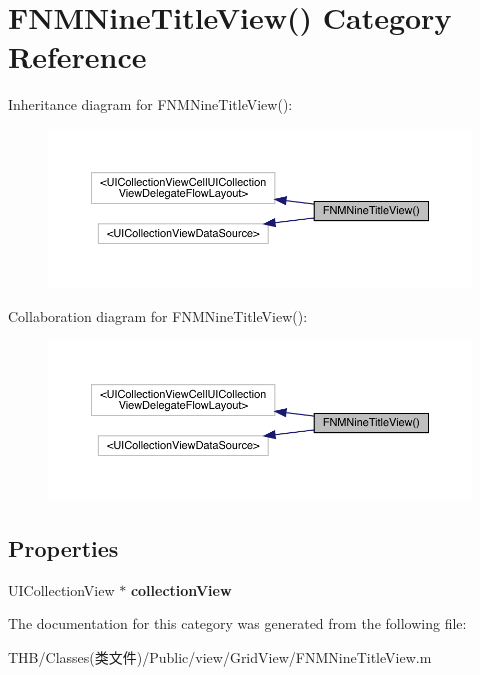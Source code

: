 \hypertarget{category_f_n_m_nine_title_view_07_08}{}\section{F\+N\+M\+Nine\+Title\+View() Category Reference}
\label{category_f_n_m_nine_title_view_07_08}


Inheritance diagram for F\+N\+M\+Nine\+Title\+View()\+:\nopagebreak
\begin{figure}[H]
\begin{center}
\leavevmode
\includegraphics[width=350pt]{category_f_n_m_nine_title_view_07_08__inherit__graph}
\end{center}
\end{figure}


Collaboration diagram for F\+N\+M\+Nine\+Title\+View()\+:\nopagebreak
\begin{figure}[H]
\begin{center}
\leavevmode
\includegraphics[width=350pt]{category_f_n_m_nine_title_view_07_08__coll__graph}
\end{center}
\end{figure}
\subsection*{Properties}
\begin{DoxyCompactItemize}
\item 
\mbox{\label{category_f_n_m_nine_title_view_07_08_af8fe45d5966128db9f34bce216212a6f}} 
U\+I\+Collection\+View $\ast$ {\bfseries collection\+View}
\end{DoxyCompactItemize}


The documentation for this category was generated from the following file\+:\begin{DoxyCompactItemize}
\item 
T\+H\+B/\+Classes(类文件)/\+Public/view/\+Grid\+View/F\+N\+M\+Nine\+Title\+View.\+m\end{DoxyCompactItemize}
